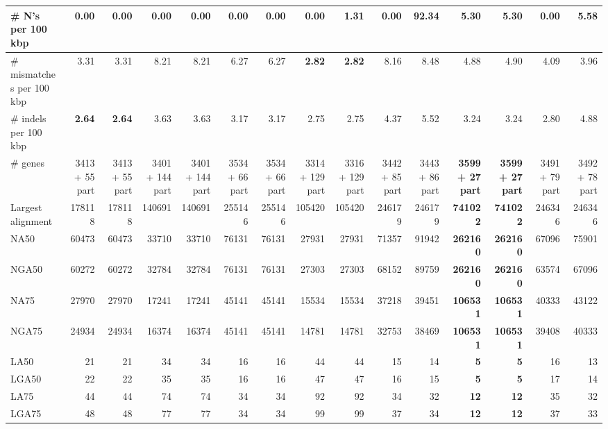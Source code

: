 \documentclass[12pt,a4paper]{article}
\begin{document}
\begin{table}[ht]
\begin{center}
\begin{tabular}{|l*{14}{|r}|}
\# N's per 100 kbp & {\bf 0.00} & {\bf 0.00} & {\bf 0.00} & {\bf 0.00} & {\bf 0.00} & {\bf 0.00} & {\bf 0.00} & 1.31 & {\bf 0.00} & 92.34 & 5.30 & 5.30 & {\bf 0.00} & 5.58 \\ \hline
\# mismatches per 100 kbp & 3.31 & 3.31 & 8.21 & 8.21 & 6.27 & 6.27 & {\bf 2.82} & {\bf 2.82} & 8.16 & 8.48 & 4.88 & 4.90 & 4.09 & 3.96 \\ \hline
\# indels per 100 kbp & {\bf 2.64} & {\bf 2.64} & 3.63 & 3.63 & 3.17 & 3.17 & 2.75 & 2.75 & 4.37 & 5.52 & 3.24 & 3.24 & 2.80 & 4.88 \\ \hline
\# genes & 3413 + 55 part & 3413 + 55 part & 3401 + 144 part & 3401 + 144 part & 3534 + 66 part & 3534 + 66 part & 3314 + 129 part & 3316 + 129 part & 3442 + 85 part & 3443 + 86 part & {\bf 3599 + 27 part} & {\bf 3599 + 27 part} & 3491 + 79 part & 3492 + 78 part \\ \hline
Largest alignment & 178118 & 178118 & 140691 & 140691 & 255146 & 255146 & 105420 & 105420 & 246179 & 246179 & {\bf 741022} & {\bf 741022} & 246346 & 246346 \\ \hline
NA50 & 60473 & 60473 & 33710 & 33710 & 76131 & 76131 & 27931 & 27931 & 71357 & 91942 & {\bf 262160} & {\bf 262160} & 67096 & 75901 \\ \hline
NGA50 & 60272 & 60272 & 32784 & 32784 & 76131 & 76131 & 27303 & 27303 & 68152 & 89759 & {\bf 262160} & {\bf 262160} & 63574 & 67096 \\ \hline
NA75 & 27970 & 27970 & 17241 & 17241 & 45141 & 45141 & 15534 & 15534 & 37218 & 39451 & {\bf 106531} & {\bf 106531} & 40333 & 43122 \\ \hline
NGA75 & 24934 & 24934 & 16374 & 16374 & 45141 & 45141 & 14781 & 14781 & 32753 & 38469 & {\bf 106531} & {\bf 106531} & 39408 & 40333 \\ \hline
LA50 & 21 & 21 & 34 & 34 & 16 & 16 & 44 & 44 & 15 & 14 & {\bf 5} & {\bf 5} & 16 & 13 \\ \hline
LGA50 & 22 & 22 & 35 & 35 & 16 & 16 & 47 & 47 & 16 & 15 & {\bf 5} & {\bf 5} & 17 & 14 \\ \hline
LA75 & 44 & 44 & 74 & 74 & 34 & 34 & 92 & 92 & 34 & 32 & {\bf 12} & {\bf 12} & 35 & 32 \\ \hline
LGA75 & 48 & 48 & 77 & 77 & 34 & 34 & 99 & 99 & 37 & 34 & {\bf 12} & {\bf 12} & 37 & 33 \\ \hline
\end{tabular}
\end{center}
\end{table}
\end{document}
